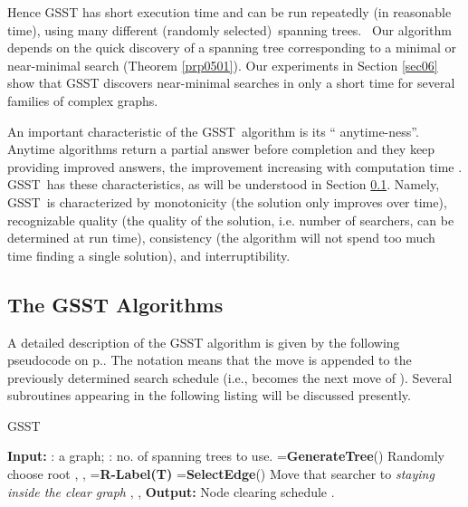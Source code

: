 \documentclass[11pt]{article}\usepackage{amsmath}
\begin{document}
Hence GSST has short execution time and can be run repeatedly (in reasonable
time), using many different (randomly selected)\ spanning trees. \ Our
algorithm depends on the quick discovery of a spanning tree corresponding to a
minimal or near-minimal search (Theorem \ref{prp0501}). Our experiments in
Section \ref{sec06} show that GSST discovers near-minimal searches in only a
short time for several families of complex graphs.

An important characteristic of the GSST\ algorithm is its \textquotedblleft
anytime-ness\textquotedblright. Anytime algorithms return a partial answer
before completion and they keep providing improved answers, the improvement
increasing with computation time \cite{Zilberstein}. GSST\ has these
characteristics, as will be understood in Section \ref{sec0502}. Namely,
GSST\ is characterized by monotonicity (the solution only improves over time),
recognizable quality (the quality of the solution, i.e. number of searchers,
can be determined at run time), consistency (the algorithm will not spend too
much time finding a single solution), and interruptibility.

\subsection{The GSST Algorithms}

\label{sec0502}

A detailed description of the GSST algorithm is given by the following
pseudocode on p.\pageref{gsst}. The notation  means that the move 
is appended to the previously determined search schedule  (i.e.,
becomes the next move of ). Several subroutines appearing in the
following listing will be discussed presently.

\begin{algorithm}[h]
\label{gsst}
\caption{GSST}
\begin{algorithmic}
\STATE \textbf{Input:} : a graph; :  no. of spanning trees to use.
\STATE 
\STATE 
\FOR{}
\STATE 
\STATE =\textbf{GenerateTree}()
\STATE Randomly choose root 
\STATE 
\STATE , 
\STATE , 
\STATE 
\STATE =\textbf{R-Label(T)}
\WHILE{}
\STATE =\textbf{SelectEdge}()
\STATE Move that searcher to  \emph{staying inside the clear graph}
\STATE 
\STATE , 
\STATE , 
\STATE 
\ELSE
\STATE 
\ENDIF
\ENDWHILE
\IF{}
\STATE 
\STATE 
\ENDIF
\ENDFOR
\STATE \textbf{Output:} Node clearing schedule .
\end{algorithmic}
\label{alg:random}
\end{algorithm}
\end{document}
